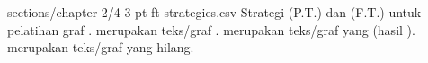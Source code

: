   {sections/chapter-2/4-3-pt-ft-strategies.csv}
  {
    Strategi \pretraining{} (P.T.) dan \finetuning{} (F.T.) untuk pelatihan graf .
     merupakan teks/graf .
     merupakan teks/graf yang  (hasil \denoising{}).
     merupakan teks/graf yang hilang.
  }
